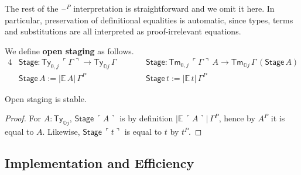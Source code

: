 \documentclass[acmsmall]{acmart}
\newcommand{\msf}[1]{\mathsf{#1}}
\newcommand{\mbb}[1]{\mathbb{#1}}
\newcommand{\mbbo}{\mbb{O}}
\newcommand{\Ty}{\msf{Ty}}
\newcommand{\Tm}{\msf{Tm}}
\newcommand{\blank}{{\mathord{\hspace{1pt}\text{--}\hspace{1pt}}}}
\newcommand{\emb}[1]{\ulcorner#1\urcorner}
\newcommand{\Stage}{\msf{Stage}}
\newcommand{\ev}{\mbb{E}}
\theoremstyle{remark}
\begin{document}
The rest of the $\blank^P$ interpretation is straightforward and we omit it
here. In particular, preservation of definitional equalities is automatic, since
types, terms and substitutions are all interpreted as proof-irrelevant
equations.

\begin{definition}\label{def:open-staging} We define \textbf{open staging} as follows.
\begin{alignat*}{4}
  & \Stage : \Ty_{0,j}\,\emb{\Gamma} \to \Ty_{\mbbo j}\,\Gamma \hspace{2em} && \Stage : \Tm_{0,j}\,\emb{\Gamma}\,A \to \Tm_{\mbbo j}\,\Gamma\,(\Stage\,A) \\
  & \Stage\,A := |\ev\,A|\,\Gamma^P && \Stage\,t := |\ev\,t|\,\Gamma^P
\end{alignat*}
\end{definition}

\begin{theorem} Open staging is stable.
\end{theorem}
\begin{proof} For $A : \Ty_{\mbbo j}$, $\Stage\,\emb{A}$ is by definition $|\ev\,\emb{A}|\,\Gamma^P$,
  hence by $A^P$ it is equal to $A$. Likewise, $\Stage\,\emb{t}$ is equal to $t$ by $t^P$.
\end{proof}

\subsection{Implementation and Efficiency}
\end{document}
